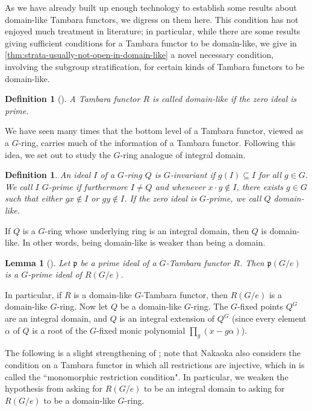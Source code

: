 \documentclass[11pt,dvipsnames]{amsart}
\newcommand{\p}{\mathfrak{p}}
\newtheorem{lemma}[theorem]{Lemma}
\theoremstyle{BoldRemark}
\newtheorem{definition}[theorem]{Definition}
\renewcommand{\subset}{\subseteq}
\begin{document}
As we have already built up enough technology to establish some results about domain-like Tambara functors, we digress on them here. This condition has not enjoyed much treatment in literature; in particular, while there are some results giving sufficient conditions for a Tambara functor to be domain-like, we give in \cref{thm:strata-usually-not-open-in-domain-like} a novel necessary condition, involving the subgroup stratification, for certain kinds of Tambara functors to be domain-like.

\begin{definition}[{\cite[Definition 4.28(1)]{Nak11a}}]\label{def:domain-like}
	A Tambara functor $R$ is called \emph{domain-like} if the zero ideal is prime.
\end{definition}

We have seen many times that the bottom level of a Tambara functor, viewed as a $G$-ring, carries much of the information of a Tambara functor. Following this idea, we set out to study the $G$-ring analogue of integral domain.

\begin{definition}
	An ideal $I$ of a $G$-ring $Q$ is $G$-invariant if $g(I) \subset I$ for all $g \in G$. We call $I$ \emph{$G$-prime} if furthermore $I \neq Q$ and whenever $x \cdot y \notin I$, there exists $g \in G$ such that either $gx \notin I$ or $gy \notin I$. If the zero ideal is $G$-prime, we call $Q$ domain-like.
\end{definition}

If $Q$ is a $G$-ring whose underlying ring is an integral domain, then $Q$ is domain-like. In other words, being domain-like is weaker than being a domain.

\begin{lemma}[{\cite[Lemma 4.3]{4DS}}]\label{lem:p-prime-implies-pGe-Gprime}
	Let $\p$ be a prime ideal of a $G$-Tambara functor $R$. Then $\p(G/e)$ is a $G$-prime ideal of $R(G/e)$.
\end{lemma}

In particular, if $R$ is a domain-like $G$-Tambara functor, then $R(G/e)$ is a domain-like $G$-ring. Now let $Q$ be a domain-like $G$-ring. The $G$-fixed points $Q^G$ are an integral domain, and $Q$ is an integral extension of $Q^G$ (since every element $\alpha$ of $Q$ is a root of the $G$-fixed monic polynomial $\prod_g (x-g\alpha)$).

The following is a slight strengthening of \cite[Proposition 4.31]{Nak11a}; note that Nakaoka also considers the condition on a Tambara functor in which all restrictions are injective, which in \cite[Definition 4.19]{Nak11a} is called the ``monomorphic restriction condition". In particular, we weaken the hypothesis from asking for $R(G/e)$ to be an integral domain to asking for $R(G/e)$ to be a domain-like $G$-ring.
\end{document}
